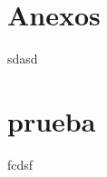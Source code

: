\documentclass[12pt]{article}
\begin{document}









\appendix
\section{Anexos}
sdasd


\section{prueba}
fcdsf




\end{document}
